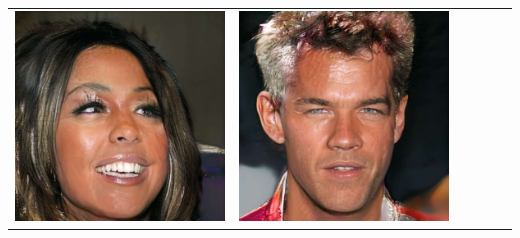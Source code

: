 \documentclass[a0,landscape]{a0poster}
\begin{document}
\begin{multicols}{3}
\begin{center}
\begin{tabular}{cc|cc|cc}
\includegraphics[width=\pganw]{../figures/pgan/50_base_iso_MH.jpg} &
\includegraphics[width=\pganw]{../figures/pgan/51_base_iso_MH.jpg} \\

\end{tabular}
\end{center}
\end{multicols}
\end{document}
